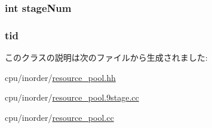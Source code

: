 \hypertarget{classResourcePool_1_1ResPoolEvent_a9da7aa2f94c428eaed5adad96a6ab151}{
\subsubsection[{stageNum}]{\setlength{\rightskip}{0pt plus 5cm}int {\bf stageNum}}}
\label{classResourcePool_1_1ResPoolEvent_a9da7aa2f94c428eaed5adad96a6ab151}
\hypertarget{classResourcePool_1_1ResPoolEvent_aa508770268ee4ceaf16054b9e0be0e17}{
\subsubsection[{tid}]{ {\bf tid}}}
\label{classResourcePool_1_1ResPoolEvent_aa508770268ee4ceaf16054b9e0be0e17}


このクラスの説明は次のファイルから生成されました:\begin{DoxyCompactItemize}
\item 
cpu/inorder/\hyperlink{resource__pool_8hh}{resource\_\-pool.hh}\item 
cpu/inorder/\hyperlink{resource__pool_89stage_8cc}{resource\_\-pool.9stage.cc}\item 
cpu/inorder/\hyperlink{resource__pool_8cc}{resource\_\-pool.cc}\end{DoxyCompactItemize}
